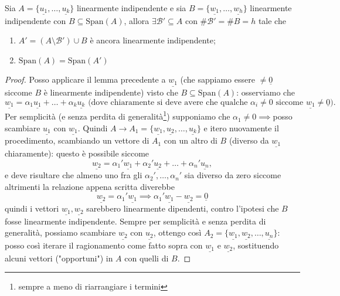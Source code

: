 \begin{lemma}
    Sia $A = \{ \underline{u_1}, \ldots, \underline{u_k} \}$ linearmente indipendente e sia $B = \{ \underline{w_1}, \ldots, \underline{w_h} \}$ linearmente indipendente con $B \subseteq \text{Span}(A)$, allora $\exists \mathcal{B'} \subseteq A$ con $\# \mathcal{B'} = \# B = h$ tale che
    \begin{enumerate}[label=\protect\circled{\arabic*}]
        \item $A' = (A \setminus \mathcal{B'}) \cup B$ è ancora linearmente indipendente;
        \item $\text{Span}(A) = \text{Span}(A')$
    \end{enumerate}
    \label{lemma:alg_scambio_pot}
\end{lemma}
\begin{proof}
    Posso applicare il lemma precedente a $\underline{w_1}$ (che sappiamo essere $\neq \underline{0}$ siccome $B$ è linearmente indipendente) visto che $B \subseteq \text{Span}(A)$: osserviamo che
    $$
        \underline{w_1} = \alpha_1 \underline{u_1} + \ldots + \alpha_k \underline{u_k} \text{ (dove chiaramente si deve avere che qualche $\alpha_i \neq 0$ siccome $\underline{w_1} \neq \underline{0}$)}.
    $$
    Per semplicità (e senza perdita di generalità\footnote{sempre a meno di riarrangiare i termini}) supponiamo che $\alpha_1 \neq 0 \implies $posso scambiare $\underline{u_1}$ con $\underline{w_1}$. Quindi $A \rightarrow A_1 = \{ \underline{w_1}, \underline{u_2}, \ldots, \underline{u_k} \}$ e itero nuovamente il procedimento, scambiando un vettore di $A_1$ con un altro di $B$ (diverso da $\underline{w_1}$ chiaramente): questo è possibile siccome
    $$
    \underline{w_2} = \alpha_1' \underline{w_1} + \alpha_2' \underline{u_2} + \ldots + \alpha_n' \underline{u_n},
    $$
    e deve risultare che almeno uno fra gli $\alpha_2', \ldots, \alpha_n'$ sia diverso da zero siccome altrimenti la relazione appena scritta diverebbe
    $$
    \underline{w_2} = \alpha_1' \underline{w_1} \implies \alpha_1' \underline{w_1} - \underline{w_2} = \underline{0}
    $$
    quindi i vettori $\underline{w_1}, \underline{w_2}$ sarebbero linearmente dipendenti, contro l'ipotesi che $B$ fosse linearmente indipendente. Sempre per semplicità e senza perdita di generalità, possiamo scambiare $\underline{w_2}$ con $\underline{u_2}$, ottengo così $A_2 = \{ \underline{w_1}, \underline{w_2}, \ldots, \underline{u_n} \}$: posso così iterare il ragionamento come fatto sopra con $\underline{w_1}$ e $\underline{w_2}$, sostituendo alcuni vettori ("opportuni") in $A$ con quelli di $B$. 
\end{proof}
